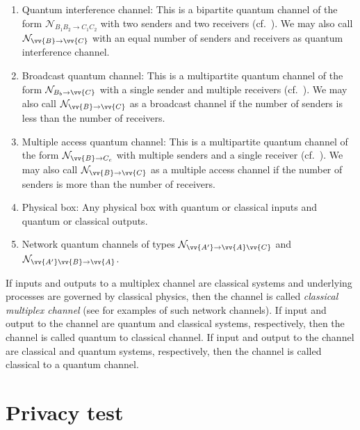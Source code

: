 \documentclass[aps,pra,twocolumn,superscriptaddress,longbibliography]{revtex4-1}
\newcommand{\mc}[1]{\mathcal{#1}}
\begin{document}
\begin{appendix}
\begin{enumerate}


\item Quantum interference channel: This is a bipartite quantum channel of the form $\mc{N}_{B_1B_2\to C_1C_2}$ with two senders and two receivers (cf.~\cite{FHSSW11}). We may also call $\mc{N}_{\vv{B}\to \vv{C}}$ with an equal number of senders and receivers as quantum interference channel. \item Broadcast quantum channel: This is a multipartite quantum channel of the form $\mc{N}_{B_b\to \vv{C}}$ with a single sender and multiple receivers (cf.~\cite{D05,YHD2006}). We may also call $\mc{N}_{\vv{B}\to\vv{C}}$ as a broadcast channel if the number of senders is less than the number of receivers. 
\item Multiple access quantum channel: This is a multipartite quantum channel of the form $\mc{N}_{\vv{B}\to C_c}$ with multiple senders and a single receiver (cf.~\cite{YHD05MQAC}). We may also call $\mc{N}_{\vv{B}\to\vv{C}}$ as a multiple access channel if the number of senders is more than the number of receivers. 
\item Physical box: Any physical box with quantum or classical inputs and quantum or classical outputs.
\item Network quantum channels of types $\mc{N}_{\vv{A'}\to \vv{A}\vv{C}}$ and $\mc{N}_{\vv{A'}\vv{B}\to \vv{A}}$. 
\end{enumerate}

If inputs and outputs to a multiplex channel are classical systems and underlying processes are governed by classical physics, then the channel is called \textit{classical multiplex channel} (see \cite{GKbook} for examples of such network channels). If input and output to the channel are quantum and classical systems, respectively, then the channel is called quantum to classical channel. If input and output to the channel are classical and quantum systems, respectively, then the channel is called classical to a quantum channel.

\section{Privacy test}\label{app:priv-t}


\end{appendix}
\end{document}
